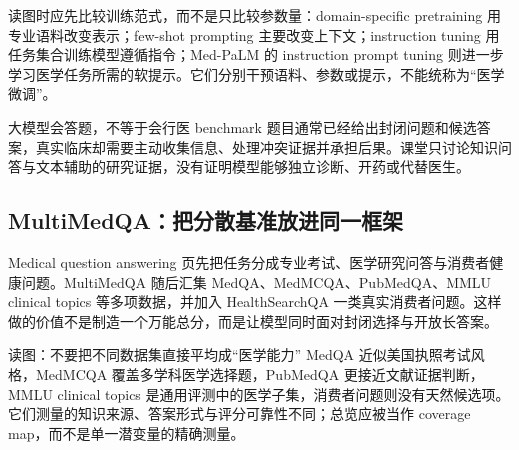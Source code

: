
读图时应先比较训练范式，而不是只比较参数量：domain-specific pretraining 用专业语料改变表示；few-shot prompting 主要改变上下文；instruction tuning 用任务集合训练模型遵循指令；Med-PaLM 的 instruction prompt tuning 则进一步学习医学任务所需的软提示。它们分别干预语料、参数或提示，不能统称为“医学微调”。

\begin{warningbox}{大模型会答题，不等于会行医}
benchmark 题目通常已经给出封闭问题和候选答案，真实临床却需要主动收集信息、处理冲突证据并承担后果。课堂只讨论知识问答与文本辅助的研究证据，没有证明模型能够独立诊断、开药或代替医生。
\end{warningbox}

\subsection{MultiMedQA：把分散基准放进同一框架}

Medical question answering 页先把任务分成专业考试、医学研究问答与消费者健康问题。MultiMedQA 随后汇集 MedQA、MedMCQA、PubMedQA、MMLU clinical topics 等多项数据，并加入 HealthSearchQA 一类真实消费者问题。这样做的价值不是制造一个万能总分，而是让模型同时面对封闭选择与开放长答案。





\begin{knowledgebox}{读图：不要把不同数据集直接平均成“医学能力”}
MedQA 近似美国执照考试风格，MedMCQA 覆盖多学科医学选择题，PubMedQA 更接近文献证据判断，MMLU clinical topics 是通用评测中的医学子集，消费者问题则没有天然候选项。它们测量的知识来源、答案形式与评分可靠性不同；总览应被当作 coverage map，而不是单一潜变量的精确测量。
\end{knowledgebox}

